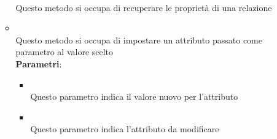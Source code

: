 \begin{itemize}
\begin{itemize}
\\ Questo metodo si occupa di recuperare le proprietà di una relazione
\item {}
\\ Questo metodo si occupa di impostare un attributo passato come parametro al valore scelto
\\ \textbf{Parametri}:
\begin{itemize}
\item {}
\\ Questo parametro indica il valore nuovo per l'attributo
\item {}
\\ Questo parametro indica l'attributo da modificare
\end{itemize}
\end{itemize}
\end{itemize}

